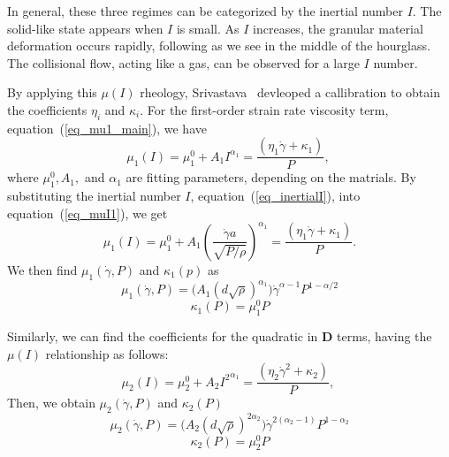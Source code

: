 \par
In general, these three regimes can be categorized by the inertial number $I$. The solid-like state appears when $I$ is small. As $I$ increases, the granular material deformation occurs rapidly, following as we see in the middle of the hourglass. The collisional flow, acting like a gas, can be observed for a large $I$ number. 
\par
By applying this $\mu(I)$ rheology, Srivastava~\cite{srivastava_viscometric_2021} devleoped a callibration to obtain the coefficients $\eta_i$ and $\kappa_i$.
For the first-order strain rate viscosity term, equation~(\ref{eq_mu1_main}), we have 
\begin{equation}
  \mu_1(I) = \mu_1^0 + A_1{ I}^{ \alpha_1} =  \frac{(\eta_1 \dot{\gamma} + \kappa_1)}{P},\
\label{eq_muI1}
\end{equation}
where $\mu_1^0, A_1,$ and $\alpha_1$ are fitting parameters, depending on the matrials. 
By substituting the inertial number $I$, equation~(\ref{eq_inertialI}), into equation~(\ref{eq_muI1}), we get
\begin{equation}
  \mu_1(I) =
     \mu_1^0 + A_1 {\left(  \frac{\dot{\gamma} a }{\sqrt{P/\rho}}\right) }^{ \alpha_1} =  \frac{(\eta_1 \dot{\gamma} + \kappa_1)}{P}.
\end{equation}
We then find $\mu_1 (\dot{\gamma}, P)$ and $\kappa_1(p)$ as
\begin{equation}
    \mu_1  (\dot{\gamma}, P)= 
    \biggl( A_1 {\left(   d  \sqrt{\rho} \right) }^{ \alpha_1}\biggr) 
     \dot{\gamma}^{\alpha-1} P^{1-\alpha/2}
\label{eq_eta1}
\end{equation}
\begin{equation}
    \kappa_1(P) = \mu_1^0 P
\label{eq_kappa1}
\end{equation}
\par
Similarly, we can find the coefficients for the quadratic in ${\bm D}$ terms, having the $\mu(I)$ relationship as follows:
\begin{equation}
    \mu_2(I) = \mu_2^0 + A_2{ I^2}^{ \alpha_1} =  \frac{(\eta_2 \dot{\gamma}^2 + \kappa_2)}{P},\
\label{eq_muI2}
\end{equation}
Then, we obtain $\mu_2 (\dot{\gamma}, P)$ and $\kappa_2(P)$
\begin{equation}
    \mu_2  (\dot{\gamma}, P)= 
    \biggl( A_2 {\left(   d  \sqrt{\rho} \right) }^{ 2\alpha_2}\biggr) 
     {\dot{\gamma}}^{2(\alpha_2-1)} P^{1-\alpha_2}
\label{eq_eta2}
\end{equation}
\begin{equation}
    \kappa_2(P) = \mu_2^0 P
\label{eq_kappa2}
\end{equation}

